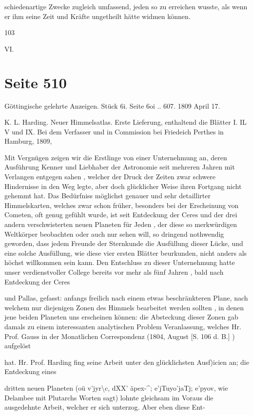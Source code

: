 \documentclass[10pt,a4paper]{article}
\begin{document}
schiedenartige Zwecke zugleich umfassend, jeden so zu erreichen wusste, als wenn er ihm seine Zeit und Kräfte ungetheilt hätte widmen können.

103

VI.


\newpage
\section*{Seite 510}
Göttingische gelehrte Anzeigen. Stück 6i. Seite 6oi .. 607. 1809 April 17.

K. L. Harding. Neuer Himmelsatlas. Erste Lieferung, enthaltend die Blätter I. IL V und IX. Bei dem Verfasser und in Commission bei Friedeich Perthes in Hamburg, 1809,

Mit Vergnügen zeigen wir die Erstlinge von einer Unternehmung an, deren Ausführung Kenner und Liebhaber der Astronomie seit mehreren Jahren mit Verlangen entgegen sahen , welcher der Druck der Zeiten zwar schwere Hindernisse in den Weg legte, aber doch glücklicher Weise ihren Fortgang nicht gehemmt hat. Das Bedürfniss möglichst genauer und sehr detaillirter Himmelskarten, welches zwar schon früher, besonders bei der Erscheinung von Cometen, oft genug gefühlt wurde, ist seit Entdeckung der Ceres und der drei andern verschwisterten neuen Planeten für Jeden , der diese so merkwürdigen Weltkörper beobachten oder auch nur sehen will, so dringend nothwendig geworden, dass jedem Freunde der Sternkunde die Ausfüllung dieser Lücke, und eine solche Ausfüllung, wie diese vier ersten Blätter beurkunden, nicht anders als höchst willkommen sein kann. Den Entschluss zu dieser Unternehmung hatte unser verdienstvoller College bereits vor mehr als fünf Jahren , bald nach Entdeckung der Ceres

und Pallas, gefasst: anfangs freilich nach einem etwas beschränkteren Plane, nach welchem nur diejenigen Zonen des Himmels bearbeitet werden sollten , in denen jene beiden Planeten uns erscheinen können: die Absteckung dieser Zonen gab damals zu einem interessanten analytischen Problem Veranlassung, welches Hr. Prof. Gauss in der Monatlichen Correspondenz (1804, August [S. 106 d. B.] ) aufgelöst

hat. Hr. Prof. Harding fing seine Arbeit unter den glücklichsten Ausf)icien an; die Entdeckung eines

dritten neuen Planeten (oü v'jyr\textbackslash{}c, dXX' äpex-\textasciicircum{}; e'jTuyo'jaTj; e'pyov, wie Delambee mit Plutarchs Worten sagt) lohnte gleichsam im Voraus die ausgedehnte Arbeit, welcher er sich unterzog. Aber eben diese Ent-
\end{document}

